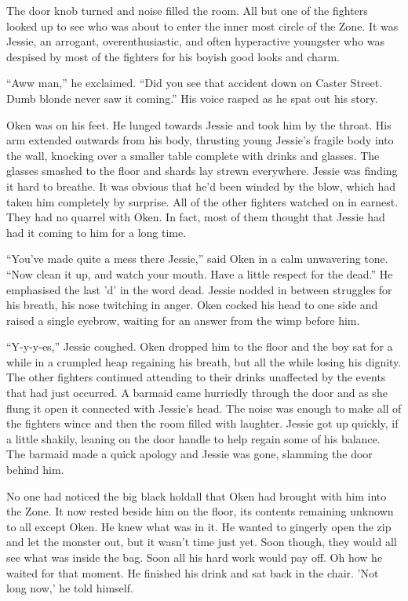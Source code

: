 The door knob turned and noise filled the room. All but one of the fighters looked up to see who was about to enter the inner most circle of the Zone. It was Jessie, an arrogant, overenthusiastic, and often hyperactive youngster who was despised by most of the fighters for his boyish good looks and charm.

``Aww man,'' he exclaimed. ``Did you see that accident down on Caster Street. Dumb blonde never saw it coming.'' His voice rasped as he spat out his story.

Oken was on his feet. He lunged towards Jessie and took him by the throat. His arm extended outwards from his body, thrusting young Jessie's fragile body into the wall, knocking over a smaller table complete with drinks and glasses. The glasses smashed to the floor and shards lay strewn everywhere. Jessie was finding it hard to breathe. It was obvious that he'd been winded by the blow, which had taken him completely by surprise. All of the other fighters watched on in earnest. They had no quarrel with Oken. In fact, most of them thought that Jessie had had it coming to him for a long time.

``You've made quite a mess there Jessie,'' said Oken in a calm unwavering tone. ``Now clean it up, and watch your mouth. Have a little respect for the dead.'' He emphasised the last 'd' in the word dead. Jessie nodded in between struggles for his breath, his nose twitching in anger. Oken cocked his head to one side and raised a single eyebrow, waiting for an answer from the wimp before him.

``Y-y-y-es,'' Jessie coughed. Oken dropped him to the floor and the boy sat for a while in a crumpled heap regaining his breath, but all the while losing his dignity. The other fighters continued attending to their drinks unaffected by the events that had just occurred. A barmaid came hurriedly through the door and as she flung it open it connected with Jessie's head. The noise was enough to make all of the fighters wince and then the room filled with laughter. Jessie got up quickly, if a little shakily, leaning on the door handle to help regain some of his balance. The barmaid made a quick apology and Jessie was gone, slamming the door behind him.

No one had noticed the big black holdall that Oken had brought with him into the Zone. It now rested beside him on the floor, its contents remaining unknown to all except Oken. He knew what was in it. He wanted to gingerly open the zip and let the monster out, but it wasn't time just yet. Soon though, they would all see what was inside the bag. Soon all his hard work would pay off. Oh how he waited for that moment. He finished his drink and sat back in the chair. 'Not long now,' he told himself.
